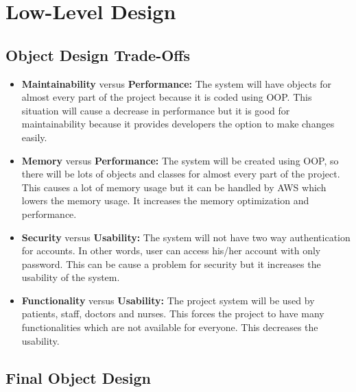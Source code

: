\documentclass[a4paper, 12pt, titlepage]{article}
\begin{document}
  \section{Low-Level Design}

  \subsection{Object Design Trade-Offs}

  \begin{itemize}
    \item \textbf{Maintainability} versus \textbf{Performance:}
      The system will have objects for almost every part of the project because it is coded using OOP.
      This situation will cause a decrease in performance but it is good for maintainability
      because it provides developers the option to make changes easily.
    \item \textbf{Memory} versus \textbf{Performance:}
      The system will be created using OOP, so there will be lots of objects and classes
      for almost every part of the project.
      This causes a lot of memory usage but it can be handled by AWS which lowers the memory usage.
      It increases the memory optimization and performance.
    \item \textbf{Security} versus \textbf{Usability:}
      The system will not have two way authentication for accounts.
      In other words, user can access his/her account with only password.
      This can be cause a problem for security but it increases the usability of the system.
    \item \textbf{Functionality} versus \textbf{Usability:}
      The project system will be used by patients, staff, doctors and nurses.
      This forces the project to have many functionalities which are not available for everyone.
      This decreases the usability.
  \end{itemize}

  \subsection{Final Object Design}
\end{document}
